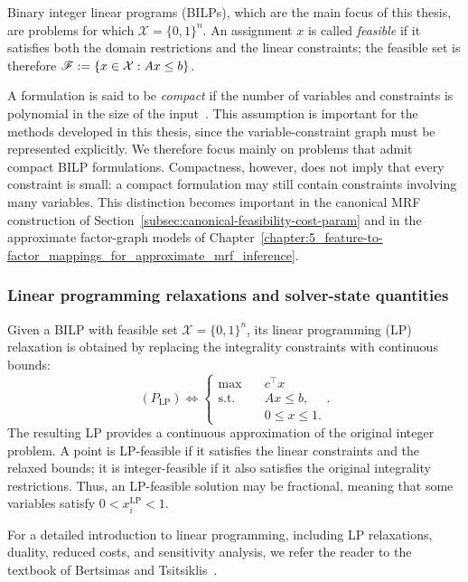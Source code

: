 Binary integer linear programs (BILPs), which are the main focus of this thesis, are problems for which $\mathcal{X}=\{0,1\}^n$. An assignment $x$ is called \emph{feasible} if it satisfies both the domain restrictions and the linear constraints; the feasible set is therefore $\mathscr{F} := \{x\in\mathcal{X} : Ax \leq b\}$.

A formulation is said to be \emph{compact} if the number of variables and constraints is polynomial in the size of the input~\cite{yannakakis_expressing_1988,carr_compact_2000}. This assumption is important for the methods developed in this thesis, since the variable-constraint graph must be represented explicitly. We therefore focus mainly on problems that admit compact BILP formulations. Compactness, however, does not imply that every constraint is small: a compact formulation may still contain constraints involving many variables. This distinction becomes important in the canonical MRF construction of Section~\ref{subsec:canonical-feasibility-cost-param} and in the approximate factor-graph models of Chapter~\ref{chapter:5_feature-to-factor_mappings_for_approximate_mrf_inference}.

\subsubsection{Linear programming relaxations and solver-state quantities}
Given a BILP with feasible set $\mathcal{X}=\{0,1\}^n$, its linear programming (LP) relaxation is obtained by replacing the integrality constraints with continuous bounds:
\begin{equation}
(P_{\mathrm{LP}}) \Leftrightarrow \left\{
\begin{aligned}
\max \quad & c^\top x \\
\text{s.t.} \quad & Ax \leq b, \\
& 0 \leq x \leq 1 .
\end{aligned} \right. .
\end{equation}
The resulting LP provides a continuous approximation of the original integer problem. A point is LP-feasible if it satisfies the linear constraints and the relaxed bounds; it is integer-feasible if it also satisfies the original integrality restrictions. Thus, an LP-feasible solution may be fractional, meaning that some variables satisfy $0<x_i^{\mathrm{LP}}<1$.

For a detailed introduction to linear programming, including LP relaxations, duality, reduced costs, and sensitivity analysis, we refer the reader to the textbook of Bertsimas and Tsitsiklis~\cite{bertsimas_introduction_1997}.

